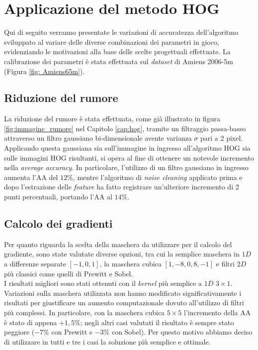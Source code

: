 %

\section{Applicazione del metodo HOG}
Qui di seguito verranno presentate le variazioni di accuratezza dell'algoritmo sviluppato al variare delle diverse combinazioni dei parametri in gioco, evidenziando le motivazioni alla base delle scelte progettuali effettuate. La calibrazione dei parametri è stata effettuata sul \emph{dataset} di Amiens 2006-5m (Figura \ref{fig: Amiens65m}). 

\subsection{Riduzione del rumore}
La riduzione del rumore è stata effettuata, come già illustrato in figura \ref{fig:immagine_rumore} nel Capitolo \ref{cap:hog}, tramite un filtraggio passa-basso attraverso un filtro gaussiano bi-dimensionale avente varianza $\sigma$ pari a 2 pixel. Applicando questa gaussiana sia sull'immagine in ingresso all'algoritmo HOG sia sulle immagini HOG risultanti, si opera al fine di ottenere un notevole incremento nella \emph{average accuracy}. In particolare, l'utilizzo di un filtro gaussiano in ingresso aumenta l'AA del $12\%$, mentre l'algoritmo di \emph{noise cleaning} applicato prima e dopo l'estrazione delle \emph{feature} ha fatto registrare un'ulteriore incremento di 2 punti percentuali, portando l'AA al $14\%$.

\subsection{Calcolo dei gradienti}
Per quanto riguarda la scelta della maschera da utilizzare per il calcolo del gradiente, sono state valutate diverse opzioni, tra cui la semplice maschera in $1D$ a differenze separate $[-1, 0 ,1]$, la maschera cubica $[1,-8,0,8,-1]$ e filtri  $2D$ più classici come quelli di Prewitt e Sobel.\\
I risultati migliori sono stati ottenuti con il \emph{kernel} più semplice a $1D$ $3\times1$. Variazioni sulla maschera utilizzata non hanno modificato significativamente i risultati per giustificare un aumento computazionale dovuto all'utilizzo di filtri più complessi. In particolare, con la maschera cubica $5\times5$ l'incremento della AA è stato di appena $+1,5\%$; negli altri casi valutati il risultato è sempre stato peggiore ($-7\%$ con Prewitt e $-3\%$ con Sobel). Per questo motivo abbiamo deciso di utilizzare in tutti e tre i casi la soluzione più semplice e ottimale.\\

